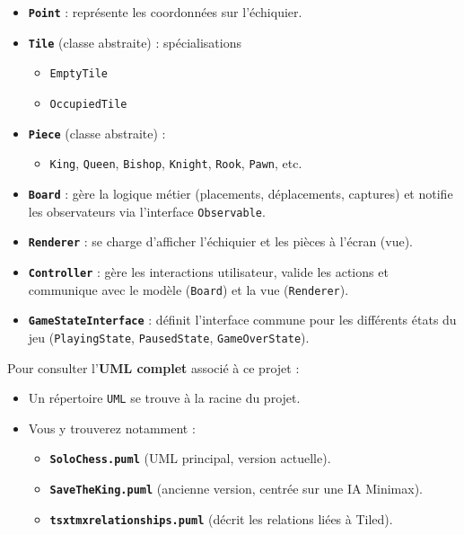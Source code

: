 \documentclass[11pt,a4paper]{article}
\begin{document}
\begin{itemize}[leftmargin=1.5em]
    \item \textbf{\texttt{Point}} : représente les coordonnées sur l’échiquier.
    \item \textbf{\texttt{Tile}} (classe abstraite) : spécialisations
    \begin{itemize}
        \item \texttt{EmptyTile}
        \item \texttt{OccupiedTile}
    \end{itemize}
    \item \textbf{\texttt{Piece}} (classe abstraite) :
    \begin{itemize}
        \item \texttt{King}, \texttt{Queen}, \texttt{Bishop}, \texttt{Knight}, \texttt{Rook}, \texttt{Pawn}, etc.
    \end{itemize}
    \item \textbf{\texttt{Board}} : gère la logique métier (placements, déplacements, captures) et notifie les observateurs via l’interface \texttt{Observable}.
    \item \textbf{\texttt{Renderer}} : se charge d’afficher l’échiquier et les pièces à l’écran (vue).
    \item \textbf{\texttt{Controller}} : gère les interactions utilisateur, valide les actions et communique avec le modèle (\texttt{Board}) et la vue (\texttt{Renderer}).
    \item \textbf{\texttt{GameStateInterface}} : définit l’interface commune pour les différents états du jeu (\texttt{PlayingState}, \texttt{PausedState}, \texttt{GameOverState}).
\end{itemize}

Pour consulter l’\textbf{UML complet} associé à ce projet :
\begin{itemize}
    \item Un répertoire \texttt{UML} se trouve à la racine du projet.
    \item Vous y trouverez notamment :
    \begin{itemize}
        \item \textbf{\texttt{SoloChess.puml}} (UML principal, version actuelle).
        \item \textbf{\texttt{SaveTheKing.puml}} (ancienne version, centrée sur une IA Minimax).
        \item \textbf{\texttt{tsxtmxrelationships.puml}} (décrit les relations liées à Tiled).
    \end{itemize}
\end{itemize}
\end{document}
